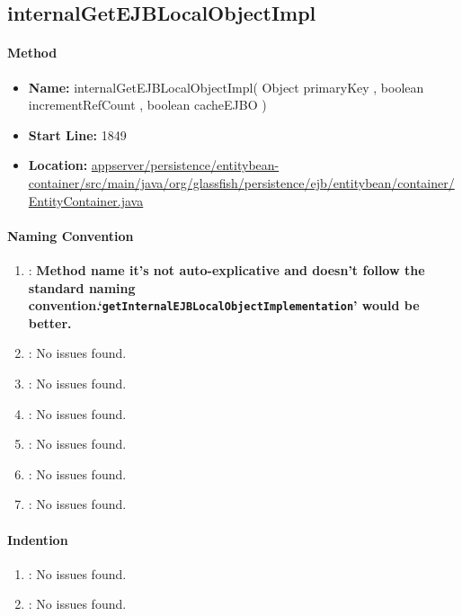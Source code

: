 \subsection{internalGetEJBLocalObjectImpl} %
\label{sub:internalGetEJBLocalObjectImpl}

\paragraph{Method}
\label{par:method}
\begin{itemize}
	\item \textbf{Name:} internalGetEJBLocalObjectImpl( Object primaryKey , boolean incrementRefCount , boolean cacheEJBO )
	\item \textbf{Start Line:} 1849
	\item \textbf{Location:} \url{appserver/persistence/entitybean-container/src/main/java/org/glassfish/persistence/ejb/entitybean/container/EntityContainer.java}
\end{itemize}

\paragraph{Naming Convention} %
\label{par:naming_convention}

\begin{enumerate}
	\item \emph{\checkA}: \textbf{Method name it's not auto-explicative and doesn't follow the standard naming convention.\newline`\texttt{getInternalEJBLocalObjectImplementation}' would be better.}
	\item \emph{\checkB}: No issues found.
	\item \emph{\checkC}: No issues found.
	\item \emph{\checkD}: No issues found.
	\item \emph{\checkE}: No issues found.
	\item \emph{\checkF}: No issues found.
	\item \emph{\checkG}: No issues found.
\end{enumerate}

\paragraph{Indention} %
\label{par:indention}

\begin{enumerate} [resume]
	\item \emph{\checkH}: No issues found.
	\item \emph{\checkI}: No issues found.
\end{enumerate}

